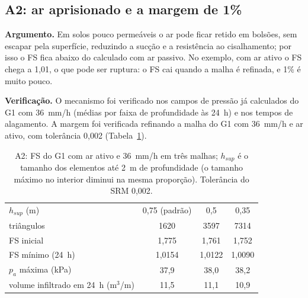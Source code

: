 \subsection{A2: ar aprisionado e a margem de 1\%}

\textbf{Argumento.} Em solos pouco perme\'aveis o ar pode ficar retido em bols\~oes, sem escapar pela superf\'icie,
reduzindo a suc\c{c}\~ao e a resist\^encia ao cisalhamento; por isso o FS fica abaixo do calculado com ar passivo. No
exemplo, com ar ativo o FS chega a 1,01, o que pode ser ruptura: o FS cai quando a malha \'e refinada, e 1\% \'e muito
pouco.

\textbf{Verifica\c{c}\~ao.} O mecanismo foi verificado nos campos de press\~ao j\'a calculados do G1 com 36~mm/h
(m\'edias por faixa de profundidade \`as 24~h) e nos tempos de alagamento. A margem foi verificada refinando a malha do
G1 com 36~mm/h e ar ativo, com toler\^ancia 0,002 (Tabela~\ref{tab:disc_A2}).

\begin{table}[h!]
\centering\small
\caption{A2: FS do G1 com ar ativo e 36~mm/h em tr\^es malhas; $h_{sup}$ \'e o tamanho dos elementos at\'e 2~m de
profundidade (o tamanho m\'aximo no interior diminui na mesma propor\c{c}\~ao). Toler\^ancia do SRM 0,002.}
\label{tab:disc_A2}
\begin{tabular}{lccc}
\toprule
$h_{sup}$ (m) & 0,75 (padr\~ao) & 0,5 & 0,35\\
tri\^angulos & 1620 & 3597 & 7314\\
\midrule
FS inicial & 1,775 & 1,761 & 1,752\\
FS m\'inimo (24~h) & 1,0154 & 1,0122 & 1,0090\\
$p_a$ m\'axima (kPa) & 37,9 & 38,0 & 38,2\\
volume infiltrado em 24~h (m$^3$/m) & 11,5 & 11,1 & 10,9\\
\bottomrule
\end{tabular}
\end{table}

